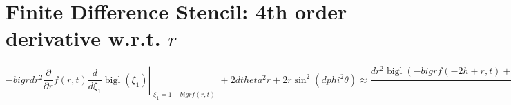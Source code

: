 \documentclass{article}
\begin{document}
\section*{Finite Difference Stencil: 4th order derivative w.r.t. $r$}


\[
- bigr dr^{2} \frac{\partial}{\partial r} f{\left(r,t \right)} \left. \frac{d}{d \xi_{1}} \operatorname{bigl}{\left(\xi_{1} \right)} \right|_{\substack{ \xi_{1}=1 - bigr f{\left(r,t \right)} }} + 2 dtheta^{2} r + 2 r \sin^{2}{\left(dphi^{2} \theta \right)} \approx \frac{dr^{2} \operatorname{bigl}{\left(- bigr f{\left(- 2 h + r,t \right)} + 1 \right)} - 8 dr^{2} \operatorname{bigl}{\left(- bigr f{\left(- h + r,t \right)} + 1 \right)} + 8 dr^{2} \operatorname{bigl}{\left(- bigr f{\left(h + r,t \right)} + 1 \right)} - dr^{2} \operatorname{bigl}{\left(- bigr f{\left(2 h + r,t \right)} + 1 \right)} + 24 dtheta^{2} h r + 24 h r \sin^{2}{\left(dphi^{2} \theta \right)}}{12 h} \quad (O(h^4))
\]
\end{document}
